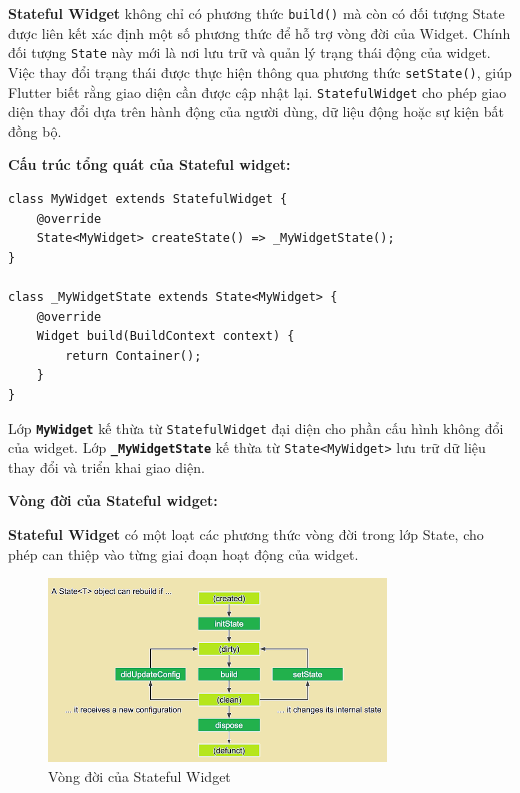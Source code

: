 \documentclass[../DoAn.tex]{subfiles}
\numberwithin{figure}{chapter}
\begin{document}
\textbf{Stateful Widget} không chỉ có phương thức \texttt{build()} mà còn có đối tượng State được liên kết xác định một số phương thức để hỗ trợ vòng đời của Widget. Chính đối tượng \texttt{State} này mới là nơi lưu trữ và quản lý trạng thái động của widget. Việc thay đổi trạng thái được thực hiện thông qua phương thức \texttt{setState()}, giúp Flutter biết rằng giao diện cần được cập nhật lại.
\texttt{StatefulWidget} cho phép giao diện thay đổi dựa trên hành động của người dùng, dữ liệu động hoặc sự kiện bất đồng bộ.

\textbf{Cấu trúc tổng quát của Stateful widget:}

\begin{lstlisting}
class MyWidget extends StatefulWidget {
    @override
    State<MyWidget> createState() => _MyWidgetState();
}

class _MyWidgetState extends State<MyWidget> {
    @override
    Widget build(BuildContext context) {
        return Container(); 
    }
}
\end{lstlisting}

Lớp \textbf{\texttt{MyWidget}} kế thừa từ \texttt{StatefulWidget} đại diện cho phần cấu hình không đổi của widget. Lớp \textbf{\texttt{\_MyWidgetState}} kế thừa từ \texttt{State<MyWidget>} lưu trữ dữ liệu thay đổi và triển khai giao diện.

\textbf{Vòng đời của Stateful widget:}

\textbf{Stateful Widget} có một loạt các phương thức vòng đời trong lớp State, cho phép can thiệp vào từng giai đoạn hoạt động của widget.
\begin{figure}[H]
    \centering
    \includegraphics[width=0.8\textwidth]{Hinhve/Chuong5/statefulwidgetimg.png}
    \caption{Vòng đời của Stateful Widget}
    \label{fig:statefulwidgetimg}
\end{figure}
\end{document}

